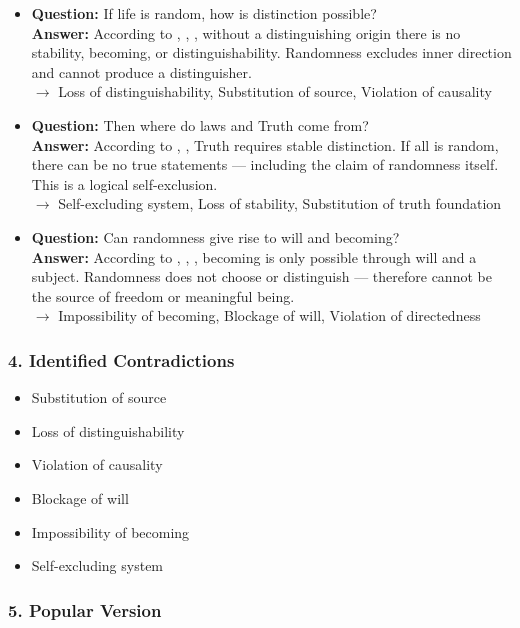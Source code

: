 \documentclass[12pt]{article}
\begin{document}
\begin{itemize}
\item \textbf{Question:} If life is random, how is distinction possible?\\
\textbf{Answer:} According to \text{[1]}, \text{[3]}, \text{[4.1]}, without a distinguishing origin there is no stability, becoming, or distinguishability. Randomness excludes inner direction and cannot produce a distinguisher.\\
$\rightarrow$ Loss of distinguishability, Substitution of source, Violation of causality

\item \textbf{Question:} Then where do laws and Truth come from?\\
\textbf{Answer:} According to \text{[3]}, \text{[11.2]}, Truth requires stable distinction. If all is random, there can be no true statements — including the claim of randomness itself. This is a logical self-exclusion.\\
$\rightarrow$ Self-excluding system, Loss of stability, Substitution of truth foundation

\item \textbf{Question:} Can randomness give rise to will and becoming?\\
\textbf{Answer:} According to \text{[4.3]}, \text{[12.2]}, \text{[11.3.2]}, becoming is only possible through will and a subject. Randomness does not choose or distinguish — therefore cannot be the source of freedom or meaningful being.\\
$\rightarrow$ Impossibility of becoming, Blockage of will, Violation of directedness
\end{itemize}

\subsubsection*{4. Identified Contradictions}

\begin{itemize}
\item Substitution of source
\item Loss of distinguishability
\item Violation of causality
\item Blockage of will
\item Impossibility of becoming
\item Self-excluding system
\end{itemize}

\subsubsection*{5. Popular Version}
\end{document}

